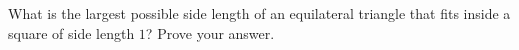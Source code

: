 What is the largest possible side length of an equilateral triangle that fits inside a square of side length $1$? Prove your answer.
